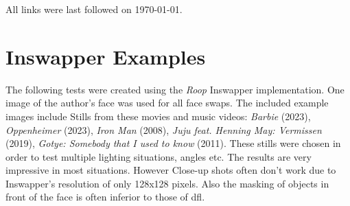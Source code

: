 \documentclass[
  a4paper,  %
  twoside,  %
  bibliography=totoc,
  headsepline,
  cleardoublepage=empty,
  parskip=half,
  draft=false
]{scrbook}
\begin{document}

\printbibliography
All links were last followed on \today{}.

\appendix
\chapter{Inswapper Examples}
\label{chap:insightface-demos}
The following tests were created using the \textit{Roop} Inswapper implementation. One image of the author's face was used for all face swaps. The included example images include Stills from these movies and music videos: \textit{Barbie} (2023), \textit{Oppenheimer} (2023), \textit{Iron Man} (2008), \textit{Juju feat. Henning May: Vermissen} (2019), \textit{Gotye: Somebody that I used to know} (2011).
These stills were chosen in order to test multiple lighting situations, angles etc. The results are very impressive in most situations. However Close-up shots often don't work due to Inswapper's resolution of only 128x128 pixels. Also the masking of objects in front of the face is often inferior to those of \gls{dfl}.
\end{document}
